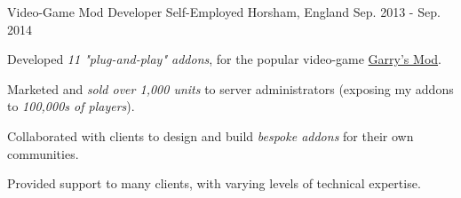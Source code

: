 \begin{cventries}
  \cventry
    {Video-Game Mod Developer} %
    {Self-Employed} %
    {Horsham, England} %
    {Sep. 2013 - Sep. 2014} %
    {
      \begin{cvitems} %
        \item Developed \textit{11 "plug-and-play" addons}, for the popular video-game \href{https://gmod.facepunch.com/}{Garry's Mod}.
        \item Marketed and \textit{sold over 1,000 units} to server administrators (exposing my addons to \textit{100,000s of players}).
        \item Collaborated with clients to design and build \textit{bespoke addons} for their own communities.
        \item Provided support to many clients, with varying levels of technical expertise.
      \end{cvitems}
    }
    {}
\end{cventries}
